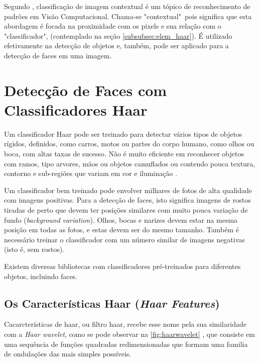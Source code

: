 Segundo , classificação de imagem contextual é um tópico de reconhecimento de padrões em  Visão Computacional. Chama-se "contextual"\ pois significa que esta abordagem é focada na proximidade com os pixels e sua relação com o "classificador", (contemplado na seção \autoref{subsubsec:elem_haar}). É utilizado efetivamente na detecção de objetos e, também, pode ser aplicado para a detecção de faces em uma imagem.








\section{Detecção de Faces com Classificadores Haar}\label{sec:deteccao}

Um classificador Haar pode ser treinado para detectar vários tipos de objetos rígidos, definidos, como carros, motos ou partes do corpo humano, como olhos ou boca, com altas taxas de sucesso. Não é muito eficiente em reconhecer objetos com ramos, tipo arvores, mãos ou objetos camuflados ou contendo pouca textura, contorno e sub-regiões que variam em cor e iluminação \cite{drmathew_java_programming}.

Um classificador bem treinado pode envolver milhares de fotos de alta qualidade com imagens positivas. Para a detecção de faces, isto significa imagens de rostos tiradas de perto que devem ter posições similares com muito pouca variação de fundo (\textit{background} \textit{variation}). Olhos, bocas e narizes devem estar na mesma posição em todas as fotos, e estas devem ser do mesmo tamanho. Também é necessário treinar o classificador com um número similar de imagens negativas (isto é, sem rostos).

Existem diversas bibliotecas com classificadores pré-treinados para diferentes objetos, incluindo faces.


\subsection{Os Características Haar (\textit{Haar Features}) }\label{subsubsec:elem_haar}

Cacarcterísticas de haar, ou filtro haar, recebe esse nome pela sua similaridade com a \textit{Haar wavelet}, como se pode observar na \autoref{fig:haarwavelet} , que consiste em uma sequência de funções quadradas redimensionadas que formam uma familia de ondulações das mais simples possíveis.

